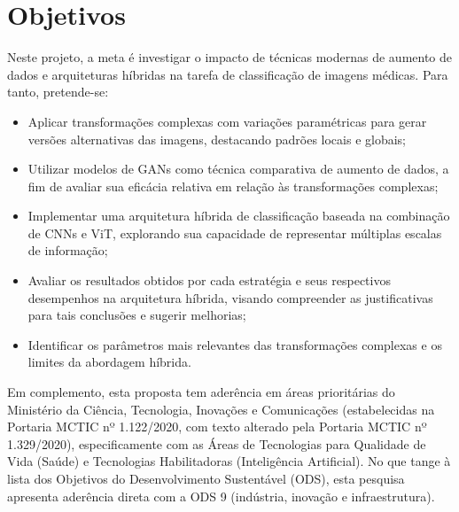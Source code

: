\section{Objetivos}

Neste projeto, a meta é investigar o impacto de técnicas modernas de aumento de dados e arquiteturas híbridas na tarefa de classificação de imagens médicas. Para tanto, pretende-se:

\begin{itemize}
    \item 
    Aplicar transformações complexas com variações paramétricas para gerar versões alternativas das imagens, destacando padrões locais e globais;
    \item 
    Utilizar modelos de GANs como técnica comparativa de aumento de dados, a fim de avaliar sua eficácia relativa em relação às transformações complexas;
    \item 
    Implementar uma arquitetura híbrida de classificação baseada na combinação de CNNs e ViT, explorando sua capacidade de representar múltiplas escalas de informação;
    \item
    Avaliar os resultados obtidos por cada estratégia e seus respectivos desempenhos na arquitetura híbrida, visando compreender as justificativas para tais conclusões e sugerir melhorias;
    \item Identificar os parâmetros mais relevantes das transformações complexas e os limites da abordagem híbrida.
\end{itemize}

Em complemento, esta proposta tem aderência em áreas prioritárias do Ministério da Ciência, Tecnologia, Inovações e Comunicações (estabelecidas na Portaria MCTIC nº 1.122/2020, com texto alterado pela Portaria MCTIC nº 1.329/2020), especificamente com as Áreas de Tecnologias para Qualidade de Vida (Saúde) e Tecnologias Habilitadoras (Inteligência Artificial). No que tange à lista dos Objetivos do Desenvolvimento Sustentável (ODS), esta pesquisa apresenta aderência direta com a ODS 9 (indústria, inovação e infraestrutura).